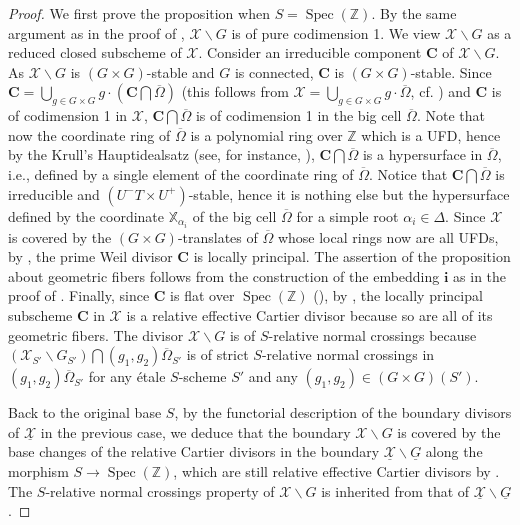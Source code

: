 \documentclass[11pt, reqno]{amsart}
\theoremstyle{plain}
\theoremstyle{definition}
\DeclareMathOperator{\Spec}{Spec}		%
\begin{document}
\begin{proof}
    We first prove the proposition when $S=\Spec(\mathbb{Z})$. By the same argument as in the proof of , $\mathcal{X}\backslash G$ is of pure codimension 1. We view $\mathcal{X}\backslash G$ as a reduced closed subscheme of $\mathcal{X}$. Consider an irreducible component $\mathbf{C}$ of $\mathcal{X}\backslash G$. As $\mathcal{X}\backslash G$ is $(G\times G)$-stable and $G$ is connected, $\mathbf{C}$ is $(G\times G)$-stable. Since $\mathbf{C}=\bigcup_{g\in G\times G} g\cdot(\mathbf{C}\bigcap \overline{\Omega})$ (this follows from $\mathcal{X}=\bigcup_{g\in G\times G} g\cdot\overline{\Omega}$, cf. ) and $\mathbf{C}$ is of codimension 1 in $\mathcal{X}$, $\mathbf{C}\bigcap \overline{\Omega}$ is of codimension 1 in the big cell $\overline{\Omega}$. Note that now the coordinate ring of $\overline{\Omega}$ is a polynomial ring over $\mathbb{Z}$ which is a UFD, hence by the Krull's Hauptidealsatz (see, for instance, \cite[Chapter~I, Theorem~1.11A]{HartshorneGTM52}), $\mathbf{C}\bigcap \overline{\Omega}$ is a hypersurface in $\overline{\Omega}$, i.e., defined by a single element of the coordinate ring of $\overline{\Omega}$. Notice that $\mathbf{C}\bigcap \overline{\Omega}$ is irreducible and $(U^-T\times U^+)$-stable, hence it is nothing else but the hypersurface defined by the coordinate $\mathbb{X}_{\alpha_i}$ of the big cell $\overline{\Omega}$ for a simple root $\alpha_i\in\Delta$. Since $\mathcal{X}$ is covered by the $(G\times G)$-translates of $\overline{\Omega}$ whose local rings now are all UFDs, by \cite[Chapter~II, Proposition~6.11]{HartshorneGTM52}, the prime Weil divisor $\mathbf{C}$ is locally principal. The assertion of the proposition about geometric fibers follows from the construction of the embedding $\mathbf{i}$ as in the proof of . Finally, since $\mathbf{C}$ is flat over $\Spec(\mathbb{Z})$ (\cite[Chapter~III, Proposition~9.7]{HartshorneGTM52}), by \cite[Lemma~062Y]{stacks-project}, the locally principal subscheme $\mathbf{C}$ in $\mathcal{X}$ is a relative effective Cartier divisor because so are all of its geometric fibers. The divisor $\mathcal{X}\backslash G$ is of $S$-relative normal crossings because $(\mathcal{X}_{S'}\backslash  G_{S'})\bigcap(g_1,g_2)\overline{\Omega}_{S'}$ is of strict $S$-relative normal crossings in $(g_1,g_2)\overline{\Omega}_{S'}$ for any étale $S$-scheme $S'$ and any $(g_1,g_2)\in (G\times G)(S')$.

    Back to the original base $S$, by the functorial description of the boundary divisors of $\underline{\mathcal{X}}$ in the previous case, we deduce that the boundary $\mathcal{X}\backslash G$ is covered by the base changes of the relative Cartier divisors in the boundary $\underline{\mathcal{X}}\backslash \underline{G}$ along the morphism $S\longrightarrow \Spec(\mathbb{Z})$, which are still relative effective Cartier divisors by \cite[Lemma~056Q]{stacks-project}. The $S$-relative normal crossings property of $\mathcal{X}\backslash G$ is inherited from that of $\underline{\mathcal{X}}\backslash \underline{G}$.
\end{proof}
\end{document}
